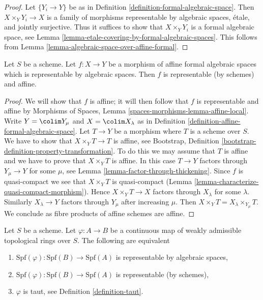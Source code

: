 \begin{proof}
Let $\{Y_i \to Y\}$ be as in
Definition \ref{definition-formal-algebraic-space}.
Then $X \times_Y Y_i \to X$ is a family of morphisms
representable by algebraic spaces, \'etale, and jointly
surjective. Thus it suffices to show that
$X \times_Y Y_i$ is a formal algebraic space, see
Lemma \ref{lemma-etale-covering-by-formal-algebraic-spaces}.
This follows from Lemma \ref{lemma-algebraic-space-over-affine-formal}.
\end{proof}

\begin{lemma}
\label{lemma-affine-representable-by-algebraic-spaces}
Let $S$ be a scheme. Let $f : X \to Y$ be a morphism of
affine formal algebraic spaces which is representable by
algebraic spaces. Then $f$ is representable (by schemes) and affine.
\end{lemma}

\begin{proof}
We will show that $f$ is affine; it will then follow that
$f$ is representable and affine by
Morphisms of Spaces, Lemma \ref{spaces-morphisms-lemma-affine-local}.
Write $Y = \colim Y_\mu$ and $X = \colim X_\lambda$ as in
Definition \ref{definition-affine-formal-algebraic-space}.
Let $T \to Y$ be a morphism where $T$ is a scheme
over $S$. We have to show that $X \times_Y T \to T$ is affine, see
Bootstrap, Definition
\ref{bootstrap-definition-property-transformation}.
To do this we may assume that $T$ is affine and we have to prove
that $X \times_Y T$ is affine. In this case $T \to Y$ factors
through $Y_\mu \to Y$ for some $\mu$, see
Lemma \ref{lemma-factor-through-thickening}.
Since $f$ is quasi-compact we see that $X \times_Y T$ is
quasi-compact (Lemma \ref{lemma-characterize-quasi-compact-morphism}).
Hence $X \times_Y T \to X$ factors through $X_\lambda$ for some
$\lambda$. Similarly $X_\lambda \to Y$ factors through $Y_\mu$
after increasing $\mu$. Then
$X \times_Y T = X_\lambda \times_{Y_\mu} T$.
We conclude as fibre products of affine schemes are affine.
\end{proof}

\begin{lemma}
\label{lemma-representable-affine}
Let $S$ be a scheme. Let $\varphi : A \to B$ be a continuous map of
weakly admissible topological rings over $S$. The following
are equivalent
\begin{enumerate}
\item $\text{Spf}(\varphi) : \text{Spf}(B) \to \text{Spf}(A)$
is representable by algebraic spaces,
\item $\text{Spf}(\varphi) : \text{Spf}(B) \to \text{Spf}(A)$
is representable (by schemes),
\item $\varphi$ is taut, see Definition \ref{definition-taut}.
\end{enumerate}
\end{lemma}

